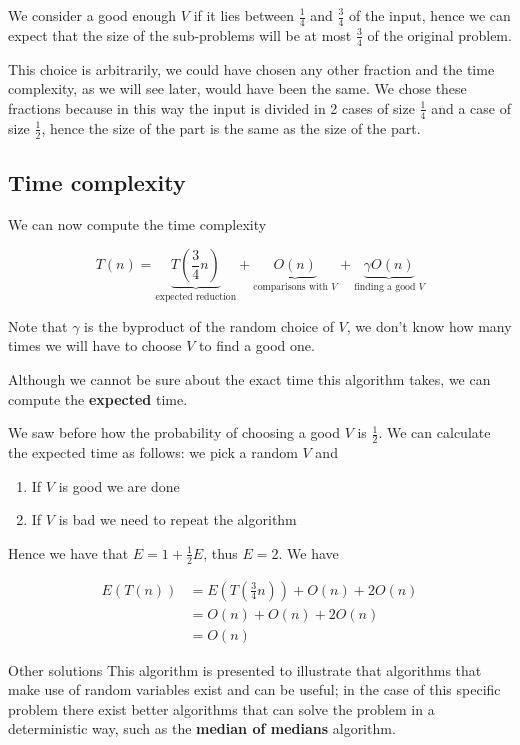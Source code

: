 \documentclass[10pt]{extarticle}
\begin{document}
We consider a good enough $V$ if it lies between $\frac{1}{4}$ and $\frac{3}{4}$ of the input,
hence we can expect that the size of the sub-problems will be at most $\frac{3}{4}$ of the original problem.

This choice is arbitrarily, we could have chosen any other fraction and the time complexity,
as we will see later, would have been the same.
We chose these fractions because in this way the input
is divided in 2  cases of size $\frac{1}{4}$ and a  case of size $\frac{1}{2}$,
hence the size of the  part is the same as the size of the  part.

\subsection{Time complexity}

We can now compute the time complexity

$$
    T(n) = \underbrace{T\left(\frac{3}{4}n\right)}
    _{\text{expected reduction}} +
    \underbrace{O(n)}_{\text{comparisons with } V}
    + \underbrace{\gamma O(n)}_{\text{finding a good } V}
$$

Note that $\gamma$ is the byproduct of the random choice of $V$,
we don't know how many times we will have to choose $V$ to find a good one.

Although we cannot be sure about the exact time this algorithm takes,
we can compute the \textbf{expected} time.

We saw before how the probability of choosing a good $V$ is $\frac{1}{2}$.
We can calculate the expected time as follows:
we pick a random $V$ and

\begin{enumerate}
    \item If $V$ is good we are done
    \item If $V$ is bad we need to repeat the algorithm
\end{enumerate}

Hence we have that $E = 1 + \frac{1}{2} E$, thus $E = 2$.
We have


\begin{align*}
    E(T(n)) & = E\left(T\left(\frac{3}{4}n\right)\right) + O(n) + 2O(n) \\
            & = O(n) + O(n) + 2O(n)                                     \\
            & = O(n)
\end{align*}

\begin{notebox}{Other solutions}
    This algorithm is presented to illustrate that algorithms that make use of random variables exist and can be useful;
    in the case of this specific problem there exist better algorithms that can solve the problem in a deterministic way,
    such as the \textbf{median of medians} algorithm.
\end{notebox}
\end{document}
